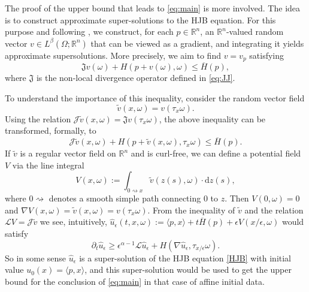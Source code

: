 \documentclass[11pt,reqno]{amsart}
\theoremstyle{definition}
\theoremstyle{remark}
\numberwithin{equation}{section}
\newcommand{\eps}{\epsilon}
\newcommand{\R}{{\mathbb{R}}}
\begin{document}
The proof of the upper bound that leads to \eqref{eq:main} is more involved. The idea is to construct approximate super-solutions to the HJB equation. For this purpose and following \cite{KRV06}, we construct, for each $p\in \R^n$, an $\mathbb{R}^n$-valued random vector $v \in L^{\beta}(\Omega;\R^n)$ that can be viewed as a gradient, and integrating it yields approximate supersolutions. More precisely, we aim to find $v = v_p$ satisfying  
\begin{equation}
\label{eq:sublifted}
    \mathfrak{J}v(\omega) + H(p + v(\omega), \omega) \leq \overline{H}(p),
\end{equation}
where $\mathfrak{J}$ is the non-local divergence operator defined in \eqref{eq:JJ}. 

To understand the importance of this inequality, consider the random vector field
$$
\widetilde v(x,\omega) = v(\tau_x \omega).
$$
Using the relation $\mathscr{J}\widetilde v(x,\omega) = \mathfrak{J}v (\tau_x\omega)$, the above inequality can be transformed, formally, to
\begin{equation*}%
    \mathscr{J}\widetilde v(x,\omega) + H(p + \widetilde v(x,\omega), \tau_x\omega) \leq \overline{H}(p).
\end{equation*}
If $\widetilde{v}$ is a regular vector field on $\R^n$ and is curl-free, we can define a potential field $V$ via the line integral
\begin{equation}
    \label{eq:vtoV}
    V(x,\omega) := \int_{0\rightsquigarrow x} \widetilde v(z(s),\omega)\cdot \mathrm{d}z(s),
\end{equation}
where $0\rightsquigarrow$ denotes a smooth simple path connecting $0$ to $z$. Then $V(0,\omega)=0$ and $\nabla V(x,\omega) = \widetilde{v}(x,\omega) = v(\tau_x \omega)$. From the inequality of $\widetilde{v}$ and the relation $\mathscr{L}V=\mathscr{J}\widetilde{v}$ we see, intuitively, $\widehat{u}_{\epsilon}(t,x,\omega):= \langle p, x \rangle + t\overline{H}(p) + \epsilon V(x/\epsilon ,\omega)$ would satisfy
\begin{equation*}
    \partial_{t}\widehat{u}_{\epsilon} \geq \epsilon^{\alpha-1} \mathscr{L}\widehat{u}_{\epsilon} + H(\nabla\widehat{u}_\eps, \tau_{x/\eps}\omega).
\end{equation*}
So in some sense $\widehat{u}_\eps$ is a super-solution of the HJB equation \eqref{HJB} with initial value $u_0(x)=\langle p,x\rangle$, and this super-solution would be used to get the upper bound for the conclusion of \eqref{eq:main} in that case of affine initial data. 
\end{document}
